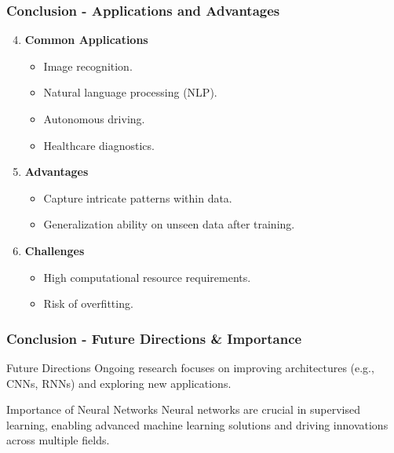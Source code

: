 \documentclass[aspectratio=169]{beamer}
\begin{document}
\begin{frame}[fragile]
  \frametitle{Conclusion - Applications and Advantages}
  \begin{enumerate}
    \setcounter{enumi}{3}
    \item \textbf{Common Applications}
    \begin{itemize}
      \item Image recognition.
      \item Natural language processing (NLP).
      \item Autonomous driving.
      \item Healthcare diagnostics.
    \end{itemize}
    
    \item \textbf{Advantages}
    \begin{itemize}
      \item Capture intricate patterns within data.
      \item Generalization ability on unseen data after training.
    \end{itemize}

    \item \textbf{Challenges}
    \begin{itemize}
      \item High computational resource requirements.
      \item Risk of overfitting.
    \end{itemize}
  \end{enumerate}
\end{frame}

\begin{frame}[fragile]
  \frametitle{Conclusion - Future Directions & Importance}
  \begin{block}{Future Directions}
    Ongoing research focuses on improving architectures (e.g., CNNs, RNNs) and exploring new applications.
  \end{block}
  
  \begin{block}{Importance of Neural Networks}
    Neural networks are crucial in supervised learning, enabling advanced machine learning solutions and driving innovations across multiple fields.
  \end{block}
\end{frame}
\end{document}
